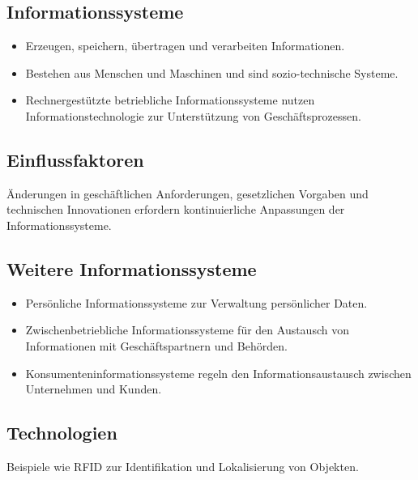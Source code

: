 \subsection{Informationssysteme}
\begin{itemize}
    \item Erzeugen, speichern, übertragen und verarbeiten Informationen.
    \item Bestehen aus Menschen und Maschinen und sind sozio-technische Systeme.
    \item Rechnergestützte betriebliche Informationssysteme nutzen Informationstechnologie zur Unterstützung von Geschäftsprozessen.
\end{itemize}

\subsection{Einflussfaktoren}
Änderungen in geschäftlichen Anforderungen, gesetzlichen Vorgaben und technischen Innovationen erfordern kontinuierliche Anpassungen der Informationssysteme.

\subsection{Weitere Informationssysteme}
\begin{itemize}
    \item Persönliche Informationssysteme zur Verwaltung persönlicher Daten.
    \item Zwischenbetriebliche Informationssysteme für den Austausch von Informationen mit Geschäftspartnern und Behörden.
    \item Konsumenteninformationssysteme regeln den Informationsaustausch zwischen Unternehmen und Kunden.
\end{itemize}

\subsection{Technologien}
Beispiele wie RFID zur Identifikation und Lokalisierung von Objekten.

